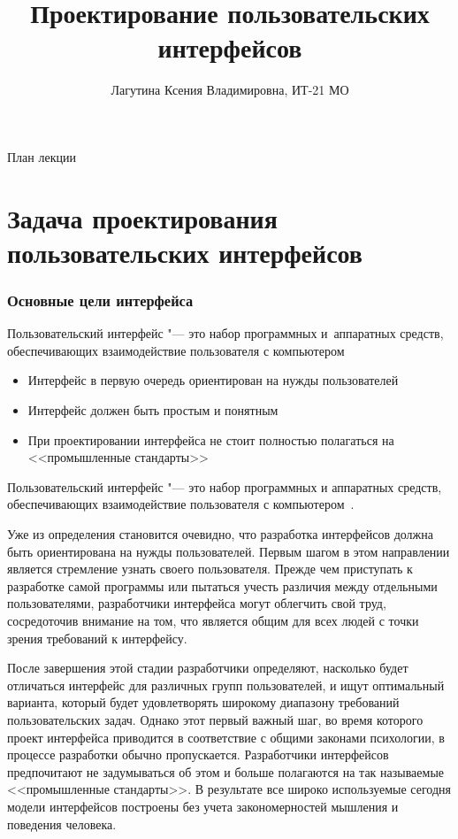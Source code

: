 \documentclass{../industrial-development}
\title{Проектирование пользовательских интерфейсов}
\author{Лагутина Ксения Владимировна, ИТ-21 МО}
\date{}
\begin{document}
\begin{frame}
  \titlepage
\end{frame}

\begin{frame}{План лекции}
  \tableofcontents
\end{frame}

\section{Задача проектирования пользовательских интерфейсов}

\begin{frame} \frametitle{Основные цели интерфейса}
  \begin{definition}
    \alert{Пользовательский интерфейс} "--- это набор программных и~аппаратных средств, обеспечивающих взаимодействие пользователя с компьютером
  \end{definition}
  
  \begin{itemize}
   \item Интерфейс в первую очередь ориентирован на нужды пользователей
   \item Интерфейс должен быть простым и понятным
   \item При проектировании интерфейса не стоит полностью полагаться на <<промышленные стандарты>>
  \end{itemize}
\end{frame}

\lecturenotes

Пользовательский интерфейс "--- это набор программных и аппаратных средств, обеспечивающих взаимодействие пользователя с компьютером~\cite{Bauman}.

Уже из определения становится очевидно, что разработка интерфейсов должна быть ориентирована на нужды пользователей. Первым шагом в этом направлении является стремление узнать своего пользователя. Прежде чем приступать к разработке самой программы или пытаться учесть различия между отдельными пользователями, разработчики интерфейса могут облегчить свой труд, сосредоточив внимание на том, что является общим для всех людей с точки зрения требований к интерфейсу.

После завершения этой стадии разработчики определяют, насколько будет отличаться интерфейс для различных групп пользователей, и ищут оптимальный варианта, который будет удовлетворять широкому диапазону требований пользовательских задач. Однако этот первый важный шаг, во время которого проект интерфейса приводится в соответствие с общими законами психологии, в процессе разработки обычно пропускается. Разработчики интерфейсов предпочитают не задумываться об этом и больше полагаются на так называемые <<промышленные стандарты>>. В результате все широко используемые сегодня модели интерфейсов построены без учета закономерностей мышления и поведения человека.
\end{document}
